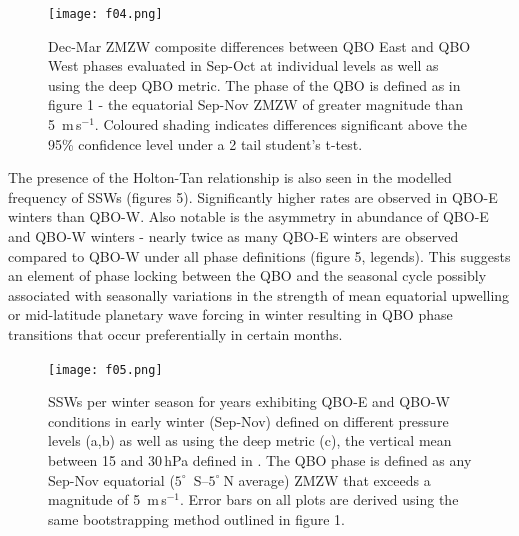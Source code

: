 
\begin{center}
\begin{figure}[h!]
\noindent\texttt{[image: f04.png]}
\caption{Dec-Mar ZMZW composite differences between QBO East and QBO West phases evaluated in Sep-Oct at individual levels as well as using the deep QBO metric. The phase of the QBO is defined as in figure 1 - the equatorial Sep-Nov ZMZW of greater magnitude than 5\ m\,s$^{-1}$. Coloured shading indicates differences significant above the 95\% confidence level under a 2 tail student’s t-test.}
\label{fig1}
\end{figure}
\end{center}

The presence of the Holton-Tan relationship is also seen in the modelled frequency of SSWs (figures 5). Significantly higher rates are observed in QBO-E winters than QBO-W. Also notable is the asymmetry in abundance of QBO-E and QBO-W winters - nearly twice as many QBO-E winters are observed compared to QBO-W under all phase definitions (figure 5, legends). This suggests an element of phase locking between the QBO and the seasonal cycle possibly associated with seasonally variations in the strength of mean equatorial upwelling or mid-latitude planetary wave forcing in winter \citep{Pascoe2005, Gruzdez2000, Kylash2015} resulting in QBO phase transitions that occur preferentially in certain months. 

\begin{center}
\begin{figure}[h!]
\noindent\texttt{[image: f05.png]}
\caption{SSWs per winter season for years exhibiting QBO-E and QBO-W conditions in early winter (Sep-Nov) defined on different pressure levels (a,b) as well as using the deep metric (c), the vertical mean between 15 and 30\,hPa defined in \cite{Andrews2019}. The QBO phase is defined as any Sep-Nov equatorial ($5^{\circ}$\ S--$5^{\circ}\ $N average) ZMZW that exceeds a magnitude of 5\ m\,s$^{-1}$. Error bars on all plots are derived using the same bootstrapping method outlined in figure 1.}
\label{fig1}
\end{figure}
\end{center}





